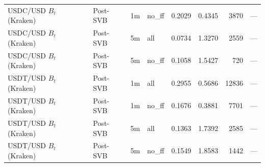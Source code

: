 \begin{table}[H]
\begin{tabular}{llllrrrl}
USDC/USD $B_t$ (Kraken) & Post-SVB & 1m & no_ff & 0.2029 & 0.4345 & 3870 & — \\
USDC/USD $B_t$ (Kraken) & Post-SVB & 5m & all & 0.0734 & 1.3270 & 2559 & — \\
USDC/USD $B_t$ (Kraken) & Post-SVB & 5m & no_ff & 0.1058 & 1.5427 & 720 & — \\
USDT/USD $B_t$ (Kraken) & Post-SVB & 1m & all & 0.2955 & 0.5686 & 12836 & — \\
USDT/USD $B_t$ (Kraken) & Post-SVB & 1m & no_ff & 0.1676 & 0.3881 & 7701 & — \\
USDT/USD $B_t$ (Kraken) & Post-SVB & 5m & all & 0.1363 & 1.7392 & 2585 & — \\
USDT/USD $B_t$ (Kraken) & Post-SVB & 5m & no_ff & 0.1549 & 1.8583 & 1442 & — \\
\bottomrule
\end{tabular}
\end{table}
